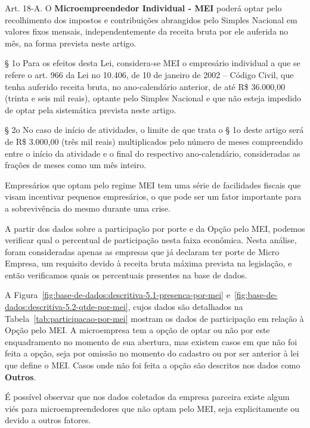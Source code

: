 \begin{citacao}
Art. 18-A.  O \textbf{Microempreendedor Individual - MEI} poderá optar pelo recolhimento dos impostos e contribuições abrangidos pelo Simples Nacional em valores fixos mensais, independentemente da receita bruta por ele auferida no mês, na forma prevista neste artigo.

§ 1o  Para os efeitos desta Lei, considera-se MEI o empresário individual a que se refere o art. 966 da Lei no 10.406, de 10 de janeiro de 2002 – Código Civil, que tenha auferido receita bruta, no ano-calendário anterior, de até R\$ 36.000,00 (trinta e seis mil reais), optante pelo Simples Nacional e que não esteja impedido de optar pela sistemática prevista neste artigo.  

§ 2o  No caso de início de atividades, o limite de que trata o § 1o deste artigo será de R\$ 3.000,00 (três mil reais) multiplicados pelo número de meses compreendido entre o início da atividade e o final do respectivo ano-calendário, consideradas as frações de meses como um mês inteiro.  
\end{citacao}

Empresários que optam pelo regime MEI tem uma série de facilidades fiscais que visam incentivar pequenos empresários, o que pode ser um fator importante para a sobrevivência do mesmo durante uma crise.

A partir dos dados sobre a participação por porte e da Opção pelo MEI, podemos verificar qual o percentual de participação nesta faixa econômica. Nesta análise, foram consideradas apenas as empresas que já declaram ter porte de Micro Empresa, um requisito devido à receita bruta máxima prevista na legislação, e então verificamos quais os percentuais presentes na base de dados.

A Figura~\ref{fig:base-de-dados:descritiva-5.1-presenca-por-mei} e~\ref{fig:base-de-dados:descritiva-5.2-qtde-por-mei}, cujos dados são detalhados na Tabela~\ref{tab:participacao-por-mei} mostram os dados de participação em relação à Opção pelo MEI. A microempresa tem a opção de optar ou não por este enquadramento no momento de sua abertura, mas existem casos em que não foi feita a opção, seja por omissão no momento do cadastro ou por ser anterior à lei que define o MEI. Casos onde não foi feita a opção são descritos nos dados como \textbf{Outros}.

É possível observar que nos dados coletados da empresa parceira existe algum viés para microempreendedores que não optam pelo MEI, seja explicitamente ou devido a outros fatores.

